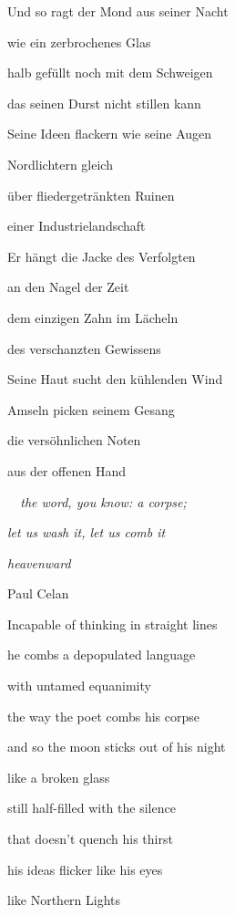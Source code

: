 \bigskip

Und so ragt der Mond aus seiner Nacht

wie ein zerbrochenes Glas

halb gefüllt noch mit dem Schweigen

das seinen Durst nicht stillen kann


\bigskip

Seine Ideen flackern wie seine Augen

Nordlichtern gleich

über fliedergetränkten Ruinen

einer Industrielandschaft


\bigskip

Er hängt die Jacke des Verfolgten

an den Nagel der Zeit

dem einzigen Zahn im Lächeln

des verschanzten Gewissens


\bigskip

Seine Haut sucht den kühlenden Wind

Amseln picken seinem Gesang

die versöhnlichen Noten

aus der offenen Hand


\bigskip



\bigskip

\emph{
\ \ the word, you know: a corpse;}

\emph{
let us wash it, let us comb it}

\emph{heavenward} 

Paul Celan


\bigskip

Incapable of thinking in straight lines

he combs a depopulated language 

with untamed equanimity

the way the poet combs his corpse


\bigskip

and so the moon sticks out of his night

like a broken glass

still half-filled with the silence

that doesn't quench his thirst


\bigskip

his ideas flicker like his eyes

like Northern Lights

